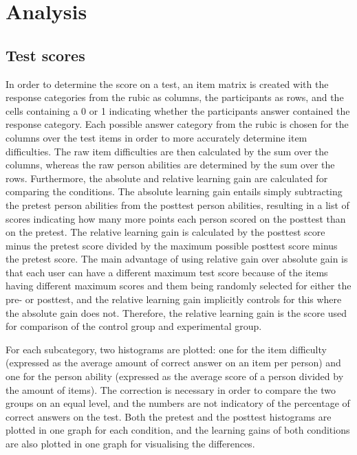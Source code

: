\section{Analysis}
\label{sec:analysis}

\subsection{Test scores}

In order to determine the score on a test, an item matrix is created with the response categories from the rubic as columns, the participants as rows, and the cells containing a 0 or 1 indicating whether the participants answer contained the response category. Each possible answer category from the rubic is chosen for the columns over the test items in order to more accurately determine item difficulties. The raw item difficulties are then calculated by the sum over the columns, whereas the raw person abilities are determined by the sum over the rows. Furthermore, the absolute and relative learning gain are calculated for comparing the conditions. The absolute learning gain entails simply subtracting the pretest person abilities from the posttest person abilities, resulting in a list of scores indicating how many more points each person scored on the posttest than on the pretest. The relative learning gain is calculated by the posttest score minus the pretest score divided by the maximum possible posttest score minus the pretest score. The main advantage of using relative gain over absolute gain is that each user can have a different maximum test score because of the items having different maximum scores and them being randomly selected for either the pre- or posttest, and the relative learning gain implicitly controls for this where the absolute gain does not. Therefore, the relative learning gain is the score used for comparison of the control group and experimental group.

For each subcategory, two histograms are plotted: one for the item difficulty (expressed as the average amount of correct answer on an item per person) and one for the person ability (expressed as the average score of a person divided by the amount of items). The correction is necessary in order to compare the two groups on an equal level, and the numbers are not indicatory of the percentage of correct answers on the test. Both the pretest and the posttest histograms are plotted in one graph for each condition, and the learning gains of both conditions are also plotted in one graph for visualising the differences.

